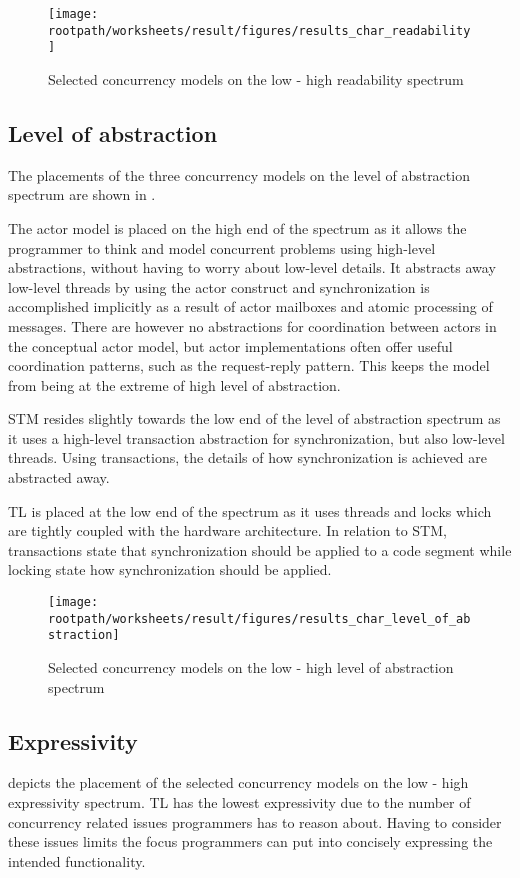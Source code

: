\begin{figure}[htbp]
\centering
 \texttt{[image: \\rootpath/worksheets/result/figures/results\_char\_readability]} 
 \caption{Selected concurrency models on the low - high readability spectrum}
\label{fig:results_char_readability}
\end{figure}

\subsection{Level of abstraction}
The placements of the three concurrency models on the level of abstraction spectrum are shown in .

The actor model is placed on the high end of the spectrum as it allows the programmer to think and model concurrent problems using high-level abstractions, without having to worry about low-level details. It abstracts away low-level threads by using the actor construct and synchronization is accomplished implicitly as a result of actor mailboxes and atomic processing of messages. There are however no abstractions for coordination between actors in the conceptual actor model, but actor implementations often offer useful coordination patterns, such as the request-reply pattern. This keeps the model from being at the extreme of high level of abstraction.

\ac{STM} resides slightly towards the low end of the level of abstraction spectrum as it uses a high-level transaction abstraction for synchronization, but also low-level threads. Using transactions, the details of how synchronization is achieved are abstracted away. 

\ac{TL} is placed at the low end of the spectrum as it uses threads and locks which are tightly coupled with the hardware architecture. In relation to \ac{STM}, transactions state that synchronization should be applied to a code segment while locking state how synchronization should be applied.

\begin{figure}[htbp]
\centering
 \texttt{[image: \\rootpath/worksheets/result/figures/results\_char\_level\_of\_abstraction]} 
 \caption{Selected concurrency models on the low - high level of abstraction spectrum}
\label{fig:results_char_level_of_abstraction}
\end{figure}

\subsection{Expressivity}
 depicts the placement of the selected concurrency models on the low - high expressivity spectrum. \ac{TL} has the lowest expressivity due to the number of concurrency related issues programmers has to reason about. Having to consider these issues limits the focus programmers can put into concisely expressing the intended functionality.

